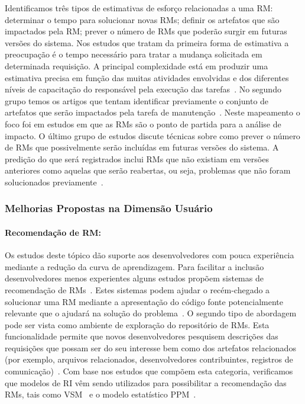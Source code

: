 Identificamos três tipos de estimativas de esforço relacionadas a uma RM\@:
determinar o tempo para solucionar novas RMs; definir os artefatos que são
impactados pela RM\@; prever o número de RMs que poderão surgir em futuras
versões do sistema. Nos estudos que tratam da primeira forma de estimativa a
preocupação é o tempo necessário para tratar a mudança solicitada em determinada
requisição. A principal complexidade está em produzir uma estimativa precisa em
função das muitas atividades envolvidas e dos diferentes níveis de capacitação
do responsável pela execução das tarefas~\cite{xia2015automatic}. No segundo
grupo temos os artigos que tentam identificar previamente o conjunto de
artefatos que serão impactados pela tarefa de manutenção~\cite{Nagwani2010}.
Neste mapeamento o foco foi em estudos em que as RMs são o ponto de partida para
a análise de impacto. O último grupo de estudos discute técnicas sobre como
prever o número de RMs que possivelmente serão incluídas em futuras versões do
sistema. A predição do que será registrados inclui RMs que não existiam em
versões anteriores como aquelas que serão reabertas, ou seja, problemas que não
foram solucionados previamente~\cite{xia2015automatic}.

\subsubsection{Melhorias Propostas na Dimensão Usuário}\label{ssub:melhorias_dim_usuario}

\paragraph{Recomendação de RM:}

Os estudos deste tópico dão suporte aos desenvolvedores com pouca experiência
mediante a redução da curva de aprendizagem. Para facilitar a inclusão
desenvolvedores menos experientes alguns estudos propõem sistemas de
recomendação de RMs~\cite{malheiros2012source, Wang2011bug}. Estes sistemas
podem ajudar o recém-chegado a solucionar uma RM mediante a apresentação do
código fonte potencialmente relevante que o ajudará na solução do
problema~\cite{malheiros2012source}. O segundo tipo de abordagem pode ser vista
como ambiente de exploração do repositório de RMs. Esta funcionalidade permite
que novos desenvolvedores pesquisem descrições das requisições que possam ser do
seu interesse bem como dos artefatos relacionados (por exemplo, arquivos
relacionados, desenvolvedores contribuintes, registros de
comunicação)~\cite{Wang2011bug}. Com base nos estudos que compõem esta
categoria, verificamos que modelos de RI vêm sendo utilizados para possibilitar
a recomendação das RMs\@, tais como VSM~\cite{Wang2011bug} e o modelo
estatístico PPM~\cite{malheiros2012source}.

